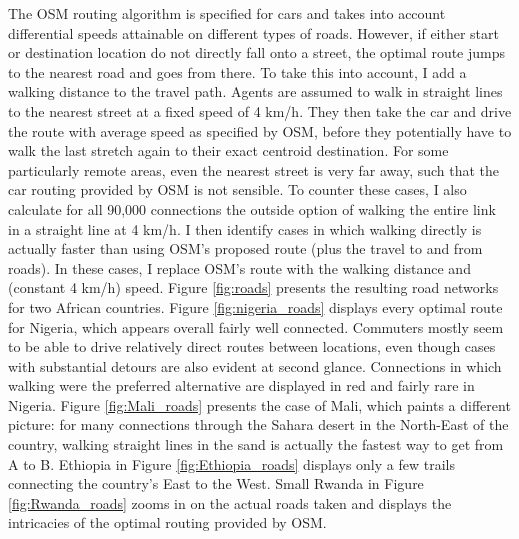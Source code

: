 \documentclass[11pt, oneside]{article}   	%
\begin{document}
The OSM routing algorithm is specified for cars and takes into account differential speeds attainable on different types of roads. However, if either start or destination location do not directly fall onto a street, the optimal route jumps to the nearest road and goes from there. To take this into account, I add a walking distance to the travel path. Agents are assumed to walk in straight lines to the nearest street at a fixed speed of 4 km/h. They then take the car and drive the route with average speed as specified by OSM, before they potentially have to walk the last stretch again to their exact centroid destination. For some particularly remote areas, even the nearest street is very far away, such that the car routing provided by OSM is not sensible. To counter these cases, I also calculate for all 90,000 connections the outside option of walking the entire link in a straight line at 4 km/h. I then identify cases in which walking directly is actually faster than using OSM's proposed route (plus the travel to and from roads). In these cases, I replace OSM's route with the walking distance and (constant 4 km/h) speed. Figure \eqref{fig:roads} presents the resulting road networks for two African countries. Figure \eqref{fig:nigeria_roads} displays every optimal route for Nigeria, which appears overall fairly well connected. Commuters mostly seem to be able to drive relatively direct routes between locations, even though cases with substantial detours are also evident at second glance. Connections in which walking were the preferred alternative are displayed in red and fairly rare in Nigeria. Figure \eqref{fig:Mali_roads} presents the case of Mali, which paints a different picture: for many connections through the Sahara desert in the North-East of the country, walking straight lines in the sand is actually the fastest way to get from A to B. Ethiopia in Figure \eqref{fig:Ethiopia_roads} displays only a few trails connecting the country's East to the West. Small Rwanda in Figure \eqref{fig:Rwanda_roads} zooms in on the actual roads taken and displays the intricacies of the optimal routing provided by OSM.
\end{document}
